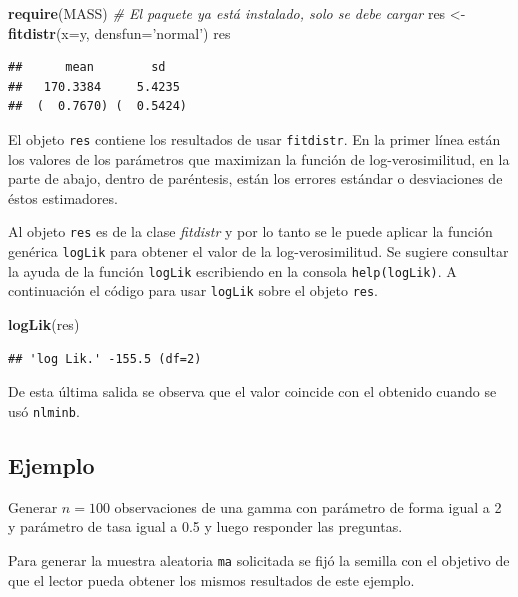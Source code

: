 \documentclass[10pt,]{krantz}
\makeatletter
\newenvironment{Shaded}{\begin{snugshade}}{\end{snugshade}}
\newcommand{\KeywordTok}[1]{\textcolor[rgb]{0.13,0.29,0.53}{\textbf{#1}}}
\newcommand{\DataTypeTok}[1]{\textcolor[rgb]{0.13,0.29,0.53}{#1}}
\newcommand{\StringTok}[1]{\textcolor[rgb]{0.31,0.60,0.02}{#1}}
\newcommand{\CommentTok}[1]{\textcolor[rgb]{0.56,0.35,0.01}{\textit{#1}}}
\newcommand{\NormalTok}[1]{#1}
\newenvironment{kframe}{%
\medskip{}
\setlength{\fboxsep}{.8em}
 \def\at@end@of@kframe{}%
 \ifinner\ifhmode%
  \def\at@end@of@kframe{\end{minipage}}%
  \begin{minipage}{\columnwidth}%
 \fi\fi%
 \def\FrameCommand##1{\hskip\@totalleftmargin \hskip-\fboxsep
 \colorbox{shadecolor}{##1}\hskip-\fboxsep
     \hskip-\linewidth \hskip-\@totalleftmargin \hskip\columnwidth}%
 \MakeFramed {\advance\hsize-\width
   \@totalleftmargin\z@ \linewidth\hsize
   \@setminipage}}%
 {\par\unskip\endMakeFramed%
 \at@end@of@kframe}
\renewenvironment{Shaded}{\begin{kframe}}{\end{kframe}}
\makeatother
\begin{document}
\begin{Shaded}
\begin{Highlighting}[]
\KeywordTok{require}\NormalTok{(MASS) }\CommentTok{# El paquete ya está instalado, solo se debe cargar}
\NormalTok{res <-}\StringTok{ }\KeywordTok{fitdistr}\NormalTok{(}\DataTypeTok{x=}\NormalTok{y, }\DataTypeTok{densfun=}\StringTok{'normal'}\NormalTok{)}
\NormalTok{res}
\end{Highlighting}
\end{Shaded}

\begin{verbatim}
##      mean        sd   
##   170.3384     5.4235 
##  (  0.7670) (  0.5424)
\end{verbatim}

El objeto \texttt{res} contiene los resultados de usar
\texttt{fitdistr}. En la primer línea están los valores de los
parámetros que maximizan la función de log-verosimilitud, en la parte de
abajo, dentro de paréntesis, están los errores estándar o desviaciones
de éstos estimadores.

Al objeto \texttt{res} es de la clase \emph{fitdistr} y por lo tanto se
le puede aplicar la función genérica \texttt{logLik} para obtener el
valor de la log-verosimilitud. Se sugiere consultar la ayuda de la
función \texttt{logLik} escribiendo en la consola \texttt{help(logLik)}.
A continuación el código para usar \texttt{logLik} sobre el objeto
\texttt{res}.

\begin{Shaded}
\begin{Highlighting}[]
\KeywordTok{logLik}\NormalTok{(res)}
\end{Highlighting}
\end{Shaded}

\begin{verbatim}
## 'log Lik.' -155.5 (df=2)
\end{verbatim}

De esta última salida se observa que el valor coincide con el obtenido
cuando se usó \texttt{nlminb}.

\subsection*{Ejemplo}\label{ejemplo-51}


Generar \(n=100\) observaciones de una gamma con parámetro de forma
igual a 2 y parámetro de tasa igual a 0.5 y luego responder las
preguntas.

Para generar la muestra aleatoria \texttt{ma} solicitada se fijó la
semilla con el objetivo de que el lector pueda obtener los mismos
resultados de este ejemplo.
\end{document}
